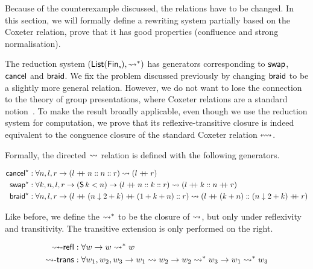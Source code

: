 Because of the counterexample discussed, the relations have to be changed. In this section, we will formally define a
rewriting system partially based on the Coxeter relation, prove that it has good properties (confluence and strong
normalisation).

The reduction system $(\List[\Fin[n]], \longcox*)$ has generators corresponding to $\swap$, $\cancel$ and $\braid$. We
fix the problem discussed previously by changing $\braid$ to be a slightly more general relation. However, we do not
want to lose the connection to the theory of group presentations, where Coxeter relations are a standard
notion~. To make the result broadly applicable, even though we use the reduction system for computation,
we prove that its reflexive-transitive closure is indeed equivalent to the conguence closure of the standard Coxeter
relation $\cox$.


Formally, the directed $\longcox$ relation is defined with the following generators.

\begin{definition}[$\longcox$]
  \begin{align*}
    \longcancel
     & : \forall n, l, r \to (l \append n \cons n \cons r) \longcox (l \append r)                                                                           \\
    \longswap
     & : \forall k, n, l, r \to (\suc[k] < n) \to (l \append n \cons k \cons r) \longcox (l \append k \cons n \append r)                                    \\
    \longbraid
     & : \forall n, l, r \to (l \append (n \downarrow 2 + k) \append (1 + k + n) \cons r) \longcox (l \append (k + n) \cons (n \downarrow 2 + k) \append r) \\
  \end{align*}
\end{definition}

Like before, we define the $\longcox*$ to be the closure of $\longcox$, but only under reflexivity and transitivity. The
transitive extension is only performed on the right.

\begin{definition}[$\longcox*$]
  \begin{align*}
    \reflr{\longcox}
     & : \forall w \to w \longcox* w                                                                               \\
    \transr{\longcox}
     & : \forall w_{1}, w_{2}, w_{3} \to  w_{1} \longcox w_{2} \to w_{2} \longcox* w_{3} \to w_{1} \longcox* w_{3} \\
  \end{align*}
\end{definition}

